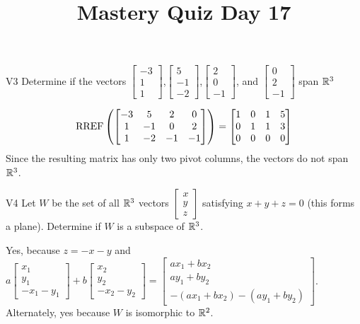 \documentclass{sbgLAquiz}
\title{Mastery Quiz Day 17 }
\begin{document}
\begin{problem}{V3}
Determine if the vectors  $\begin{bmatrix} -3 \\ 1 \\ 1 \end{bmatrix}$,$\begin{bmatrix} 5 \\ -1 \\ -2 \end{bmatrix}$,$\begin{bmatrix}2 \\ 0 \\ -1 \end{bmatrix}$, and $\begin{bmatrix} 0 \\ 2 \\ -1\end{bmatrix}$ span $\mathbb{R}^3$
\end{problem}
\begin{solution}
$$\operatorname{RREF}\left(\begin{bmatrix}
-3 & 5 & 2 & 0 \\ 1 & -1 & 0 & 2 \\ 1 & -2 & -1 & -1 \end{bmatrix}\right)=\begin{bmatrix} 1 & 0 & 1 & 5 \\ 0 & 1 & 1 & 3 \\ 0 & 0 & 0 & 0\end{bmatrix}$$
Since the resulting matrix has only two pivot columns, the vectors do not span $\mathbb{R}^3$.
\end{solution}


\begin{problem}{V4} Let \(W\) be the set of all \(\mathbb{R}^3\) vectors
\(\begin{bmatrix} x \\ y \\ z \end{bmatrix}\) satisfying \(x+y+z=0\) (this forms a plane).
Determine if \(W\) is a subspace of \(\mathbb{R}^3\).
\end{problem}
\begin{solution}
Yes, because \(z=-x-y\) and
\(
  a\begin{bmatrix} x_1 \\ y_1 \\ -x_1-y_1 \end{bmatrix}+
  b\begin{bmatrix} x_2 \\ y_2 \\ -x_2-y_2 \end{bmatrix}=
  \begin{bmatrix}
    ax_1+bx_2 \\
    ay_1+by_2 \\
    -(ax_1+bx_2)-(ay_1+by_2)
  \end{bmatrix}
\).
Alternately, yes because \(W\) is isomorphic to \(\mathbb{R}^2\).
\end{solution}
\end{document}
